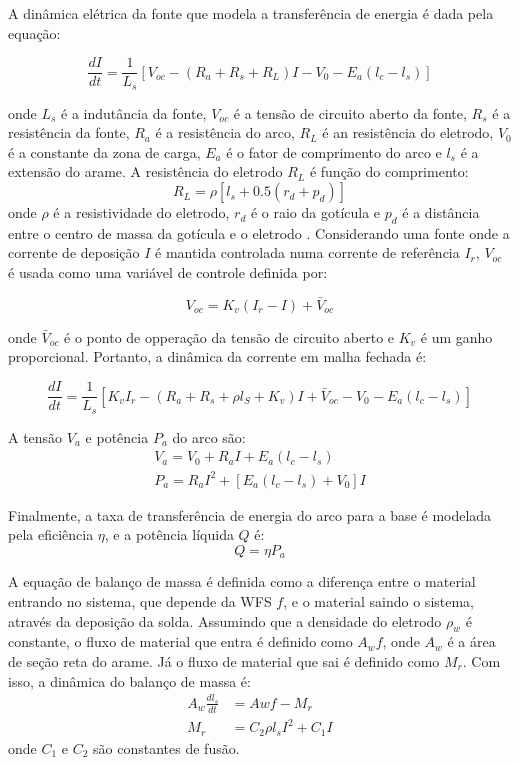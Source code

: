 A dinâmica elétrica da fonte que modela a transferência de energia é dada pela equação:

\begin{equation}
    \frac{dI}{dt} = \frac{1}{L_s} [V_{oc} - (R_a+R_s+R_L)I - V_0 -E_a(l_c-l_s)]
\end{equation}

onde $L_s$ é a indutância da fonte, $V_{oc}$ é a tensão de circuito aberto da fonte, $R_s$ é a resistência da fonte, $R_a$ é a resistência do arco, $R_L$ é an resistência do eletrodo, $V_0$ é a constante da zona de carga, $E_a$ é o fator de comprimento do arco e $l_s$ é a extensão do arame.  A resistência do eletrodo $R_L$ é função do comprimento: 
\begin{equation}
    R_L = \rho[l_s + 0.5(r_d+p_d)]
\end{equation}
onde $\rho$ é a resistividade do eletrodo, $r_d$ é o raio da gotícula e $p_d$ é a distância entre o centro de massa da gotícula e o eletrodo \cite{bendia2021multivariable}. Considerando uma fonte onde a corrente de deposição $I$ é mantida controlada numa corrente de referência $I_r$, $V_{oc}$ é usada como uma variável de controle definida por: 

\begin{equation}
    V_{oc} = K_v(I_r-I) + \bar{V}_{oc}
\end{equation}

onde $\bar{V}_{oc}$ é o ponto de opperação da tensão de circuito aberto e $K_v$ é um ganho proporcional. Portanto, a dinâmica da corrente em malha fechada é:

\begin{equation}
    \frac{dI}{dt} = \frac{1}{L_s} [K_vI_r - (R_a+R_s+\rho l_S + K_v)I + \bar{V}_{oc} - V_0 -E_a(l_c-l_s)]
\end{equation}

A tensão $V_a$ e potência $P_a$ do arco são:
\begin{align}
    V_a = V_0 + R_aI + E_a(l_c-l_s) \\
    P_a =  R_aI^2 + [E_a(l_c-l_s) + V_0]I
\end{align}

Finalmente, a taxa de transferência de energia do arco para a base é modelada pela eficiência $\eta$, e a potência líquida $Q$ é:
\begin{equation}
    Q = \eta P_a
\end{equation}

A equação de balanço de massa é definida como a diferença entre o material entrando no sistema, que depende da WFS $f$, e o material saindo o sistema, através da deposição da solda. Assumindo que a densidade do eletrodo $\rho_w$ é constante, o fluxo de material que entra é definido como $A_w f$, onde $A_w$ é a área de seção reta do arame. Já o fluxo de material que sai é definido como $M_r$. Com isso, a dinâmica do balanço de massa é:
\begin{align}
    A_w\frac{dl_s}{dt} &= Aw f - M_r \\
    M_r &= C_2\rho l_s I^2 + C_1 I
\end{align}
onde $C_1$ e $C_2$ são constantes de fusão.

